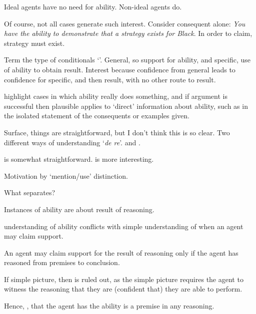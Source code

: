 \begin{note}
  Ideal agents have no need for ability.
  Non-ideal agents do.
\end{note}

\begin{note}[GSI]
  Of course, not all cases generate such interest.
  Consider consequent alone:
  \emph{You have the ability to demonstrate that a strategy exists for Black}.
  In order to claim, strategy must exist.

  Term the type of conditionals `\gsi{}'.
  General, so support for ability, and specific, use of ability to obtain result.
  Interest because confidence from general leads to confidence for specific, and then result, with no other route to result.

  \gsi{} highlight cases in which ability really does something, and if argument is successful then plausible applies to `direct' information about ability, such as in the isolated statement of the consequents or examples given.
\end{note}

\begin{note}
  Surface, things are straightforward, but I don't think this is so clear.
  Two different ways of understanding `\emph{de re}'.
  \AR{} and \WR{}.

  \AR{} is somewhat straightforward.
  \WR{} is more interesting.

  Motivation by `mention/use' distinction.
\end{note}

\begin{note}
  What separates?

  Instances of ability are about result of reasoning.

  \WR{} understanding of ability conflicts with simple understanding of when an agent may claim support.

  An agent may claim support for the result of reasoning only if the agent has reasoned from premises to conclusion.

  If simple picture, then \WR{} is ruled out, as the simple picture requires the agent to witness the reasoning that they are (confident that) they are able to perform.

  Hence, \AR{}, that the agent has the ability is a premise in any reasoning.
\end{note}

